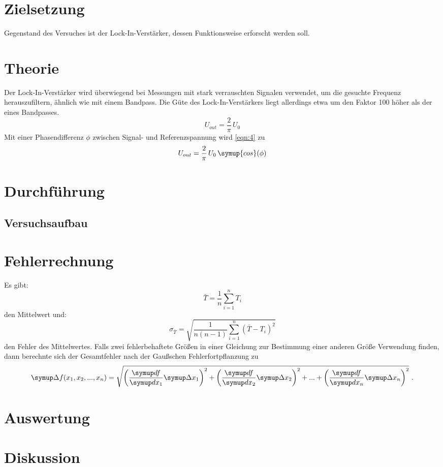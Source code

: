 \maketitle
\tableofcontents
\newpage

\section{Zielsetzung}
Gegenstand des Versuches ist der Lock-In-Verstärker, dessen Funktionsweise
erforscht werden soll.
\section{Theorie}
Der Lock-In-Verstärker wird überwiegend bei Messungen mit stark verrauschten Signalen
verwendet, um die gesuchte Frequenz herauszufiltern, ähnlich wie mit einem Bandpass.
Die Güte des Lock-In-Verstärkers liegt allerdings etwa um den Faktor 100 höher als
der eines Bandpasses.
\begin{equation}
    U_{out} = \frac{2}{\pi} \, U_0
    \label{eqn:4}
\end{equation}
Mit einer Phasendifferenz $\phi$ zwischen Signal- und Referenzspannung wird 
\eqref{eqn:4} zu
\begin{equation}
  U_{out} = \frac{2}{\pi} \, U_0 \, \symup{cos}(\phi)
  \label{eqn:5}
\end{equation}
\section{Durchführung}
\subsection{Versuchsaufbau}

\section{Fehlerrechnung}
Es gibt:
\begin{equation}
  \bar{T} = \frac{1}{n} \sum_{i=1}^{n} T_{i}
  \label{eqn:1}
\end{equation}
den Mittelwert und:
\begin{equation}
  \sigma_{\bar{T}} = \sqrt{\frac{1}{n(n-1)} \sum_{i=1}^{n}(\bar{T}-T_i)^2}
  \label{eqn:2}
\end{equation}
den Fehler des Mittelwertes. Falls zwei fehlerbehaftete Größen in einer Gleichung
zur Bestimmung einer anderen Größe Verwendung finden, dann berechnte sich der Gesamtfehler
nach der Gaußschen Fehlerfortpflanzung zu
\begin{equation}
    \symup \Delta f(x_1, x_2, ..., x_n) = \sqrt{\left(\frac{\symup df}{\symup dx_1} \symup \Delta
    x_1 \right)^2 +    \left(\frac{\symup df}{\symup dx_2} \symup \Delta
    x_2 \right)^2 + ... + \left(\frac{\symup df}{\symup dx_n} \symup \Delta x_n \right)^2} \ .
    \label{eqn:3}
\end{equation}

\section{Auswertung}
\section{Diskussion}
\newpage
\nocite{*}
\printbibliography
